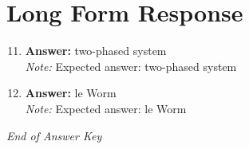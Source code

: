\documentclass[12pt]{article}
\begin{document}
\section*{Long Form Response}
\begin{enumerate}[label=\arabic*.]
\setcounter{enumi}{10}
\item \textbf{Answer:} two-phased system
\\ \textit{Note:} Expected answer: two-phased system
\item \textbf{Answer:} le Worm
\\ \textit{Note:} Expected answer: le Worm
\end{enumerate}

\vfill
\noindent\textit{End of Answer Key}
\end{document}
